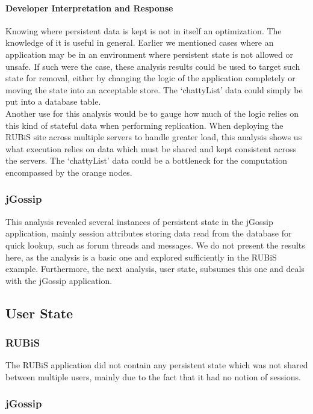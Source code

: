 \documentclass[msc,oneside]{ubcthesis}
\begin{document}
\paragraph{Developer Interpretation and Response}
Knowing where persistent data is kept is not in itself an optimization. The knowledge of it is useful in general. Earlier we mentioned cases where an application may be in an environment where persistent state is not allowed or unsafe. If such were the case, these analysis results could be used to target such state for removal, either by changing the logic of the application completely or moving the state into an acceptable store. The `chattyList' data could simply be put into a database table.\\

Another use for this analysis would be to gauge how much of the logic relies on this kind of stateful data when performing replication. When deploying the RUBiS site across multiple servers to handle greater load, this analysis shows us what execution relies on data which must be shared and kept consistent across the servers. The `chattyList' data could be a bottleneck for the computation encompassed by the orange nodes.

\subsubsection{jGossip} 

This analysis revealed several instances of persistent state in the jGossip application, mainly session attributes storing data read from the database for quick lookup, such as forum threads and messages. We do not present the results here, as the analysis is a basic one and explored sufficiently in the RUBiS example. Furthermore, the next analysis, user state, subsumes this one and deals with the jGossip application.

\subsection{User State}
\label{ana:user}
\subsubsection{RUBiS}

The RUBiS application did not contain any persistent state which was not shared between multiple users, mainly due to the fact that it had no notion of sessions.

\subsubsection{jGossip}
\end{document}
